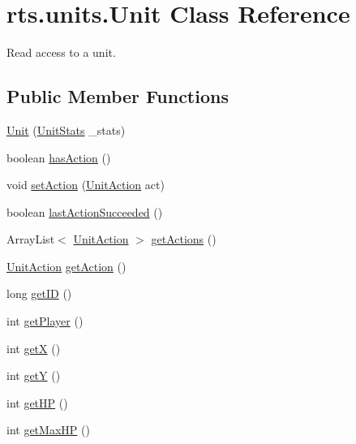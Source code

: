 \hypertarget{classrts_1_1units_1_1_unit}{
\section{rts.units.Unit Class Reference}
\label{classrts_1_1units_1_1_unit}
}


Read access to a unit.  


\subsection*{Public Member Functions}
\begin{DoxyCompactItemize}
\item 
\hyperlink{classrts_1_1units_1_1_unit_a267c78c7dfd7d74b67ce034c0fc8c6d5}{Unit} (\hyperlink{classrts_1_1units_1_1_unit_stats}{UnitStats} \_\-stats)
\item 
boolean \hyperlink{classrts_1_1units_1_1_unit_aaeda2c87f2ab709828f8593fc07fddbd}{hasAction} ()
\item 
void \hyperlink{classrts_1_1units_1_1_unit_a1aa5b9fa8983b9217d2b041a4b653dcd}{setAction} (\hyperlink{classrts_1_1units_1_1_unit_action}{UnitAction} act)
\item 
boolean \hyperlink{classrts_1_1units_1_1_unit_a7312b3ee155cdf38be11905fc351575c}{lastActionSucceeded} ()
\item 
ArrayList$<$ \hyperlink{classrts_1_1units_1_1_unit_action}{UnitAction} $>$ \hyperlink{classrts_1_1units_1_1_unit_af7617f54e1094aff238e955158f91206}{getActions} ()
\item 
\hyperlink{classrts_1_1units_1_1_unit_action}{UnitAction} \hyperlink{classrts_1_1units_1_1_unit_a42a36553506fc532417968ab52ca15d3}{getAction} ()
\item 
long \hyperlink{classrts_1_1units_1_1_unit_acaec6e776056737f21174d11a0987674}{getID} ()
\item 
int \hyperlink{classrts_1_1units_1_1_unit_a241c1a38b4fd501aa2977231410bec94}{getPlayer} ()
\item 
int \hyperlink{classrts_1_1units_1_1_unit_a3076c442cd97017417c90ee38345b3ef}{getX} ()
\item 
int \hyperlink{classrts_1_1units_1_1_unit_a3a3e1c681e1c6836c641390cf4d5d8de}{getY} ()
\item 
int \hyperlink{classrts_1_1units_1_1_unit_abc9559c1a14741ad337016fe12aafdf8}{getHP} ()
\item 
int \hyperlink{classrts_1_1units_1_1_unit_acfc48c8bcfd637513353789ee76ff14e}{getMaxHP} ()
\item 

\end{DoxyCompactItemize}
